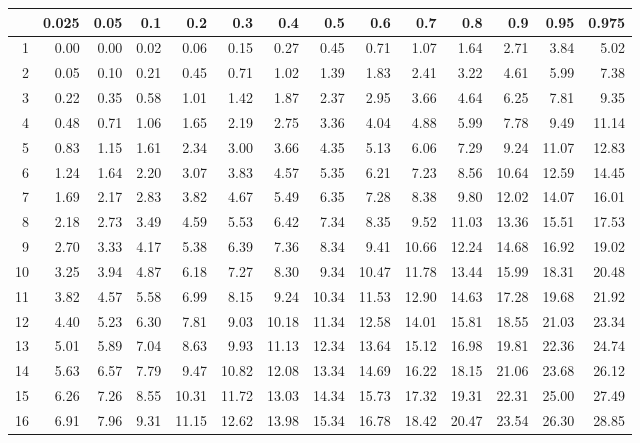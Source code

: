 \begin{table}[ht]
\centering
\begin{tabular}{rrrrrrrrrrrrrr}
  \hline
 & 0.025 & 0.05 & 0.1 & 0.2 & 0.3 & 0.4 & 0.5 & 0.6 & 0.7 & 0.8 & 0.9 & 0.95 & 0.975 \\ 
  \hline
1 & 0.00 & 0.00 & 0.02 & 0.06 & 0.15 & 0.27 & 0.45 & 0.71 & 1.07 & 1.64 & 2.71 & 3.84 & 5.02 \\ 
  2 & 0.05 & 0.10 & 0.21 & 0.45 & 0.71 & 1.02 & 1.39 & 1.83 & 2.41 & 3.22 & 4.61 & 5.99 & 7.38 \\ 
  3 & 0.22 & 0.35 & 0.58 & 1.01 & 1.42 & 1.87 & 2.37 & 2.95 & 3.66 & 4.64 & 6.25 & 7.81 & 9.35 \\ 
  4 & 0.48 & 0.71 & 1.06 & 1.65 & 2.19 & 2.75 & 3.36 & 4.04 & 4.88 & 5.99 & 7.78 & 9.49 & 11.14 \\ 
  5 & 0.83 & 1.15 & 1.61 & 2.34 & 3.00 & 3.66 & 4.35 & 5.13 & 6.06 & 7.29 & 9.24 & 11.07 & 12.83 \\ 
  6 & 1.24 & 1.64 & 2.20 & 3.07 & 3.83 & 4.57 & 5.35 & 6.21 & 7.23 & 8.56 & 10.64 & 12.59 & 14.45 \\ 
  7 & 1.69 & 2.17 & 2.83 & 3.82 & 4.67 & 5.49 & 6.35 & 7.28 & 8.38 & 9.80 & 12.02 & 14.07 & 16.01 \\ 
  8 & 2.18 & 2.73 & 3.49 & 4.59 & 5.53 & 6.42 & 7.34 & 8.35 & 9.52 & 11.03 & 13.36 & 15.51 & 17.53 \\ 
  9 & 2.70 & 3.33 & 4.17 & 5.38 & 6.39 & 7.36 & 8.34 & 9.41 & 10.66 & 12.24 & 14.68 & 16.92 & 19.02 \\ 
  10 & 3.25 & 3.94 & 4.87 & 6.18 & 7.27 & 8.30 & 9.34 & 10.47 & 11.78 & 13.44 & 15.99 & 18.31 & 20.48 \\ 
  11 & 3.82 & 4.57 & 5.58 & 6.99 & 8.15 & 9.24 & 10.34 & 11.53 & 12.90 & 14.63 & 17.28 & 19.68 & 21.92 \\ 
  12 & 4.40 & 5.23 & 6.30 & 7.81 & 9.03 & 10.18 & 11.34 & 12.58 & 14.01 & 15.81 & 18.55 & 21.03 & 23.34 \\ 
  13 & 5.01 & 5.89 & 7.04 & 8.63 & 9.93 & 11.13 & 12.34 & 13.64 & 15.12 & 16.98 & 19.81 & 22.36 & 24.74 \\ 
  14 & 5.63 & 6.57 & 7.79 & 9.47 & 10.82 & 12.08 & 13.34 & 14.69 & 16.22 & 18.15 & 21.06 & 23.68 & 26.12 \\ 
  15 & 6.26 & 7.26 & 8.55 & 10.31 & 11.72 & 13.03 & 14.34 & 15.73 & 17.32 & 19.31 & 22.31 & 25.00 & 27.49 \\ 
  16 & 6.91 & 7.96 & 9.31 & 11.15 & 12.62 & 13.98 & 15.34 & 16.78 & 18.42 & 20.47 & 23.54 & 26.30 & 28.85 \\ 

\end{tabular}
\end{table}
